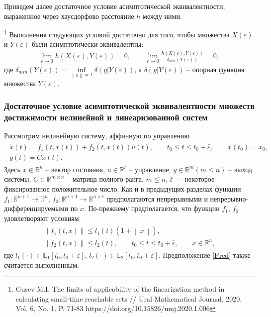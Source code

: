 \documentclass[../main.tex]{subfiles}
\begin{document}
Приведем далее достаточное условие асимптотической эквивалентности, выраженное через хаусдорфово расстояние $ h $ между ними.
\begin{theorem}\label{suff}\footnote{Gusev M.I. The limits of applicability of the linearization method in calculating small-time reachable sets // Ural Mathematical Journal. 2020. Vol. 6, No. 1. P. 71-83 https://doi.org/10.15826/umj.2020.1.006}
	 Выполнения следующих условий достаточно для того, чтобы множества $ X(\varepsilon) $ и $ Y(\varepsilon) $ были асимптотически эквивалентны:
	\begin{gather*}
		\lim\limits_{\varepsilon \rightarrow 0}h(X(\varepsilon),Y(\varepsilon)) = 0, \qquad	\lim\limits_{\varepsilon \rightarrow 0}\frac{h(X(\varepsilon),Y(\varepsilon))}{\delta_{min}(Y(\varepsilon))} = 0,
	\end{gather*}
	где $ \delta_{min}(Y(\varepsilon)) = \inf\limits_{\left\|y \right\| =1 } \delta(y|Y(\varepsilon))$, а $ \delta(y|Y(\varepsilon)) $ -- опорная функция множества $ Y(\varepsilon) $.
\end{theorem}
\subsubsection{Достаточное условие асимптотической эквивалентности множеств достижимости нелинейной и линеаризованной систем}
	Рассмотрим нелинейную систему, аффинную по управлению
\begin{gather}\label{nonlinearY}
	\begin{gathered}
		\dot{x}(t)=f_1(t,x(t))+f_2(t,x(t))u(t), \qquad t_0 \leq t \leq t_0 + \bar{\varepsilon}, \qquad x(t_0) = x_0, \\
		y(t) = C x(t).
	\end{gathered}
\end{gather}
Здесь $ x \in \mathbb{R}^n $ -- вектор состояния, $ u \in \mathbb{R}^r $ -- управление,  $ y\in\mathbb{R}^m (m \leqslant n) $ -- выход системы,
$ C\in \mathbb{R}^{m \times n} $  -- матрица полного ранга, $m\leq n$, $ \bar{\varepsilon} $ --- некоторое фиксированное положительное число.
	Как и в предыдущих разделах функции $ f_1: \mathbb{R}^{n+1} \rightarrow \mathbb{R}^{n} $, $ f_2: \mathbb{R}^{n+1} \rightarrow \mathbb{R}^{n \times r} $ предполагаются непрерывными и непрерывно-дифференцируемыми по $ x $.
По-прежнему предполагается, что функции $ f_1 $, $ f_2 $ удовлетворяют условиям
\begin{gather*}
	\begin{gathered}
		\left\| f_1(t,x) \right\| \leqslant	l_1(t)(1 + \left\| x \right\| ), \\
		\left\| f_2(t,x) \right\| \leqslant	l_2(t),  \qquad t_0 \leqslant t \leqslant t_0 + \bar{\varepsilon}, \qquad   x \in \mathbb{R}^n,
	\end{gathered}
\end{gather*}
где $ l_1(\cdot) \in \mathbb{L}_1[t_0,t_0+\bar{\varepsilon}] $, $ l_2(\cdot) \in \mathbb{L}_2[t_0,t_0+\bar{\varepsilon}] $. Предположение \ref{Pred} также считается выполненным.
\end{document}
